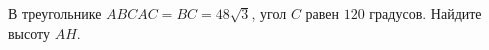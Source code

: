 \begin{ex}
	\begin{condition}
		В треугольнике \( ABC AC = BC = 48\sqrt{3} \), угол \( C \) равен \( 120  \) градусов. Найдите высоту \( AH \).
	\end{condition}
\end{ex}